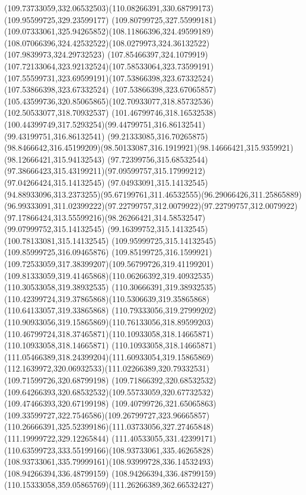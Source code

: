 {{	\curveto(109.73733059,332.06532503)(110.08266391,330.68799173)(109.95599725,329.23599177)
	\curveto(109.80799725,327.55999181)(109.07333061,325.94265852)(108.11866396,324.49599189)
	\curveto(108.07066396,324.42532522)(108.0279973,324.36132522)(107.9839973,324.29732523)
	\curveto(107.85466397,324.1079919)(107.72133064,323.92132524)(107.58533064,323.73599191)
	\curveto(107.55599731,323.69599191)(107.53866398,323.67332524)(107.53866398,323.67332524)
	\lineto(107.53866398,323.67065857)
	\curveto(105.43599736,320.85065865)(102.70933077,318.85732536)(102.50533077,318.70932537)
	\curveto(101.46799746,318.16532538)(100.44399749,317.5293254)(99.44799751,316.86132541)
	\lineto(99.43199751,316.86132541)
	\lineto(99.21333085,316.70265875)
	\curveto(98.8466642,316.45199209)(98.50133087,316.1919921)(98.14666421,315.9359921)
	\lineto(98.12666421,315.94132543)
	\curveto(97.72399756,315.68532544)(97.38666423,315.43199211)(97.09599757,315.17999212)
	\lineto(97.04266424,315.14132545)
	\lineto(97.04933091,315.14132545)
	\curveto(94.88933096,313.2373255)(95.67199761,311.46532555)(96.29066426,311.25865889)
	\curveto(96.99333091,311.02399222)(97.22799757,312.0079922)(97.22799757,312.0079922)
	\curveto(97.17866424,313.55599216)(98.26266421,314.58532547)(99.07999752,315.14132545)
	\lineto(99.16399752,315.14132545)
	\lineto(100.78133081,315.14132545)
	\lineto(109.95999725,315.14132545)
	\lineto(109.85999725,316.09465876)
	\curveto(109.85199725,316.1599921)(109.72533059,317.38399207)(109.56799726,319.41199201)
	\curveto(109.81333059,319.41465868)(110.06266392,319.40932535)(110.30533058,319.38932535)
	\lineto(110.30666391,319.38932535)
	\curveto(110.42399724,319.37865868)(110.5306639,319.35865868)(110.64133057,319.33865868)
	\curveto(110.79333056,319.27999202)(110.90933056,319.15865869)(110.76133056,318.89599203)
	\curveto(110.46799724,318.37465871)(110.10933058,318.14665871)(110.10933058,318.14665871)
	\curveto(110.10933058,318.14665871)(111.05466389,318.24399204)(111.60933054,319.15865869)
	\curveto(112.1639972,320.06932533)(111.02266389,320.79332531)(109.71599726,320.68799198)
	\lineto(109.71866392,320.68532532)
	\curveto(109.64266393,320.68532532)(109.55733059,320.67732532)(109.47466393,320.67199198)
	\curveto(109.40799726,321.65065863)(109.33599727,322.7546586)(109.26799727,323.96665857)
	\curveto(110.26666391,325.52399186)(111.03733056,327.27465848)(111.19999722,329.12265844)
	\curveto(111.40533055,331.42399171)(110.63599723,333.55199166)(108.93733061,335.46265828)
	\curveto(108.93733061,335.79999161)(108.93999728,336.14532493)(108.94266394,336.48799159)
	\curveto(108.94266394,336.48799159)(110.15333058,359.05865769)(111.26266389,362.66532427)
}}
